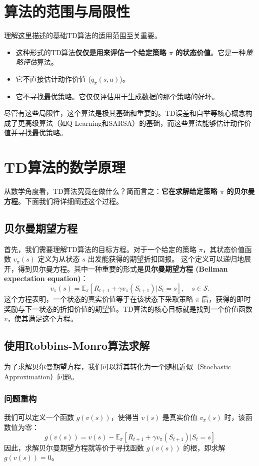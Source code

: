 \documentclass[12pt, a4paper]{article}
\begin{document}
\section{算法的范围与局限性}
理解这里描述的基础TD算法的适用范围至关重要。
\begin{itemize}
    \item 这种形式的TD算法\textbf{仅仅是用来评估一个给定策略 $\pi$ 的状态价值}。它是一种\textit{策略评估}算法。
    \item 它不直接估计动作价值 ($q_\pi(s,a)$)。
    \item 它不寻找最优策略。它仅仅评估用于生成数据的那个策略的好坏。
\end{itemize}
尽管有这些局限性，这个算法是极其基础和重要的。TD误差和自举等核心概念构成了更高级算法（如Q-Learning和SARSA）的基础，而这些算法能够估计动作价值并寻找最优策略。

\newpage
\section{TD算法的数学原理}
从数学角度看，TD算法究竟在做什么？简而言之：\textbf{它在求解给定策略 $\pi$ 的贝尔曼方程}。下面我们将详细阐述这个过程。

\subsection{贝尔曼期望方程}
首先，我们需要理解TD算法的目标方程。对于一个给定的策略 $\pi$，其状态价值函数 $v_\pi(s)$ 定义为从状态 $s$ 出发能获得的期望折扣回报。
这个定义可以递归地展开，得到贝尔曼方程。其中一种重要的形式是\textbf{贝尔曼期望方程 (Bellman expectation equation)}：
\[
v_\pi(s) = \mathbb{E}_\pi [R_{t+1} + \gamma v_\pi(S_{t+1}) | S_t = s], \quad s \in \mathcal{S}.
\]
这个方程表明，一个状态的真实价值等于在该状态下采取策略 $\pi$ 后，获得的即时奖励与下一状态的折扣价值的期望值。TD算法的核心目标就是找到一个价值函数 $v$，使其满足这个方程。

\subsection{使用Robbins-Monro算法求解}
为了求解贝尔曼期望方程，我们可以将其转化为一个随机近似（Stochastic Approximation）问题。

\subsubsection{问题重构}
我们可以定义一个函数 $g(v(s))$，使得当 $v(s)$ 是真实价值 $v_\pi(s)$ 时，该函数值为零：
\[
g(v(s)) = v(s) - \mathbb{E}_\pi [R_{t+1} + \gamma v_\pi(S_{t+1}) | S_t=s]
\]
因此，求解贝尔曼期望方程就等价于寻找函数 $g(v(s))$ 的根，即求解 $g(v(s))=0$。
\end{document}
